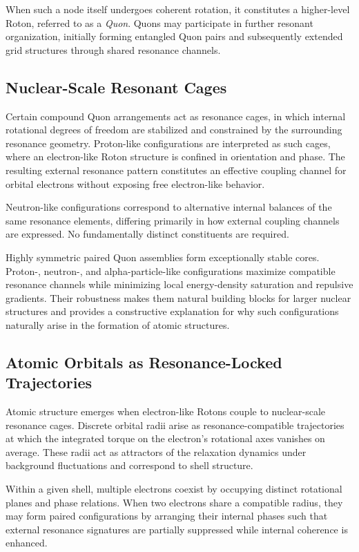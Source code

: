 \documentclass[11pt,a4paper]{article}
\begin{document}
When such a node itself undergoes coherent rotation, it constitutes a higher-level Roton,
referred to as a \emph{Quon}. Quons may participate in further resonant organization,
initially forming entangled Quon pairs and subsequently extended grid structures through
shared resonance channels.

\subsection{Nuclear-Scale Resonant Cages}

Certain compound Quon arrangements act as resonance cages, in which internal rotational
degrees of freedom are stabilized and constrained by the surrounding resonance geometry.
Proton-like configurations are interpreted as such cages, where an electron-like Roton
structure is confined in orientation and phase. The resulting external resonance pattern
constitutes an effective coupling channel for orbital electrons without exposing free
electron-like behavior.

Neutron-like configurations correspond to alternative internal balances of the same
resonance elements, differing primarily in how external coupling channels are expressed.
No fundamentally distinct constituents are required.

Highly symmetric paired Quon assemblies form exceptionally stable cores. Proton-, neutron-,
and alpha-particle-like configurations maximize compatible resonance channels while
minimizing local energy-density saturation and repulsive gradients. Their robustness makes
them natural building blocks for larger nuclear structures and provides a constructive
explanation for why such configurations naturally arise in the formation of atomic structures.


\subsection{Atomic Orbitals as Resonance-Locked Trajectories}

Atomic structure emerges when electron-like Rotons couple to nuclear-scale resonance cages.
Discrete orbital radii arise as resonance-compatible trajectories at which the integrated
torque on the electron’s rotational axes vanishes on average.
These radii act as attractors of the relaxation dynamics under background fluctuations and
correspond to shell structure.

Within a given shell, multiple electrons coexist by occupying distinct rotational planes
and phase relations.
When two electrons share a compatible radius, they may form paired configurations by
arranging their internal phases such that external resonance signatures are partially
suppressed while internal coherence is enhanced.
\end{document}

